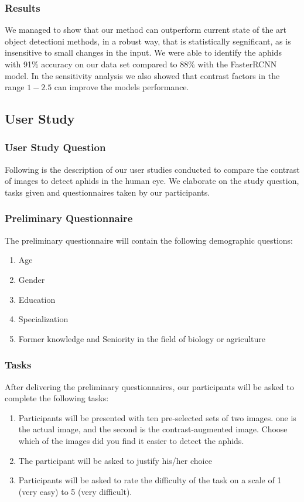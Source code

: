 \documentclass{article}
\begin{document}
\subsubsection{Results}
We managed to show that our method can outperform current state of the art object detectioni methods,
in a robust way, that is statistically segnificant, as is insensitive to small changes in the input.
We were able to identify the aphids with 91\% accuracy on our data set compared to 88\% with the FasterRCNN model.
In the sensitivity analysis we also showed that contrast factors in the range \(1-2.5\) can improve the models performance.

\newpage
\subsection{User Study}

\subsubsection{User Study Question}
Following is the description of our user studies conducted to compare the contrast of images to detect aphids in the human eye. We elaborate on the study question, tasks given and questionnaires taken by our participants.
\subsubsection{Preliminary Questionnaire}
The preliminary questionnaire will contain the following demographic questions: 

\begin{enumerate}
    \item Age
    \item Gender
    \item Education
    \item Specialization
    \item Former knowledge and Seniority in the field of biology or agriculture
\end{enumerate}

\subsubsection{Tasks}
After delivering the preliminary questionnaires, our participants will be asked to complete the following tasks:

\begin{enumerate}
    \item Participants will be presented with ten pre-selected sets of two images. one is the actual image, and the second is the contrast-augmented image.
    Choose which of the images did you find it easier to detect the aphids.
    \item The participant will be asked to justify his/her choice
    \item Participants will be asked to rate the difficulty of the task on a scale of 1 (very easy) to 5 (very difficult).
\end{enumerate}
\end{document}
